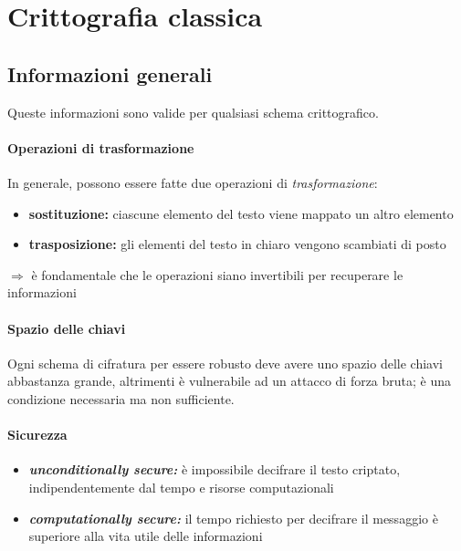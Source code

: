 \chapter{Crittografia classica}

\section{Informazioni generali}

Queste informazioni sono valide per qualsiasi schema crittografico.

\subsubsection{Operazioni di trasformazione}

In generale, possono essere fatte due operazioni di \textit{trasformazione}:
\begin{itemize}
    \item \textbf{sostituzione:} ciascune elemento del testo viene mappato un altro elemento 
    \item \textbf{trasposizione:} gli elementi del testo in chiaro vengono scambiati di posto
\end{itemize}

\noindent $\Rightarrow$ è fondamentale che le operazioni siano invertibili per recuperare le informazioni


\subsubsection{Spazio delle chiavi}

Ogni schema di cifratura per essere robusto deve avere uno spazio delle chiavi 
abbastanza grande, altrimenti è vulnerabile ad un attacco di forza bruta;
è una condizione necessaria ma non sufficiente.

\subsubsection{Sicurezza}

\begin{itemize}
    \item \textit{\textbf{unconditionally secure:}} è impossibile decifrare il testo 
    criptato, indipendentemente dal tempo e risorse computazionali
    \item \textit{\textbf{computationally secure:}} il tempo richiesto 
    per decifrare il messaggio è superiore alla vita utile delle informazioni 
\end{itemize}

